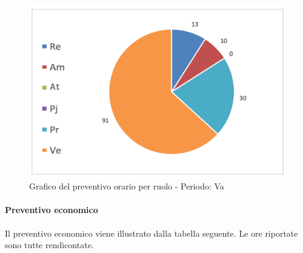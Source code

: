 			\begin{figure}[H]
			\centering
			\includegraphics[scale=0.32]{img/h_r_Va}
			\caption{Grafico del preventivo orario per ruolo - Periodo: Va}
			\label{fig:Va"}
			\end{figure}

			\newpage
			\paragraph{Preventivo economico}
			Il preventivo economico viene illustrato dalla tabella seguente. Le ore riportate sono tutte rendicontate.\\


